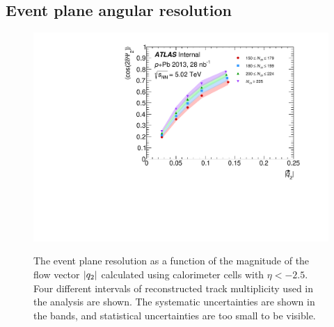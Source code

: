 \subsection{Event plane angular resolution}
\label{subsec:epres}
\begin{figure}[t]
\centering
\includegraphics{epRes.pdf}\\
\caption{The event plane resolution as a function of the magnitude of the flow vector $|q_{2}|$ calculated using calorimeter cells with $\eta < -2.5$. Four different intervals of reconstructed track multiplicity \Nch used in the analysis are shown. The systematic uncertainties are shown in the bands, and statistical uncertainties are too small to be visible.}
\label{fig:ep_res}
\end{figure}

